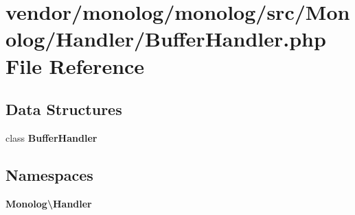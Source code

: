 \section{vendor/monolog/monolog/src/\+Monolog/\+Handler/\+Buffer\+Handler.php File Reference}
\label{_buffer_handler_8php}
\subsection*{Data Structures}
\begin{DoxyCompactItemize}
\item 
class {\bf Buffer\+Handler}
\end{DoxyCompactItemize}
\subsection*{Namespaces}
\begin{DoxyCompactItemize}
\item 
 {\bf Monolog\textbackslash{}\+Handler}
\end{DoxyCompactItemize}
